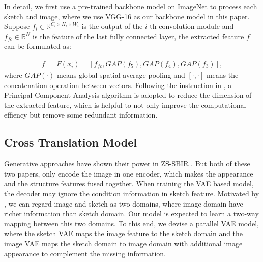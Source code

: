 \documentclass[10pt,twocolumn,letterpaper]{article}
\begin{document}
In detail, we first use a pre-trained backbone model on ImageNet \cite{deng2009imagenet} to process each sketch and image, where we use VGG-16 as our backbone model in this paper. 
Suppose $f_i \in \mathbb{R}^{C_i \times H_i \times W_i}$ is the output of the $i$-th convolution module and $f_{fc} \in \mathbb{R}^{N}$ is the feature of the last fully connected layer, the extracted feature $f^{\cdot}$ can be formulated as:

\begin{align}
f^{\cdot} = F(x_i^{\cdot}) = [f_{fc}, GAP(f_5), GAP(f_4), GAP(f_3)],
\end{align}
where $GAP(\cdot)$ means global spatial average pooling and $[\cdot,\cdot]$ means the concatenation operation between vectors. Following the instruction in \cite{wang2019stacked}, a Principal Component Analysis algorithm is adopted to reduce the dimension of the extracted feature, which is helpful to not only improve the computational effiency but remove some redundant information.

\subsection{Cross Translation Model} \label{3.3}
Generative approaches have shown their power in ZS-SBIR \cite{wang2019stacked,yelamarthi2018zero}. But both of these two papers, only encode the image in one encoder, which makes the appearance and the structure features fused together. When training the VAE based model, the decoder may ignore the condition information in sketch feature. Motivated by \cite{zhu2017toward}, we can regard image and sketch as two domains, where image domain have richer information than sketch domain. Our model is expected to learn a two-way mapping between this two domains. To this end, we devise a parallel VAE model, where the sketch VAE maps the image feature to the sketch domain and the image VAE maps the sketch domain to image domain with additional image appearance to complement the missing information.
\end{document}

